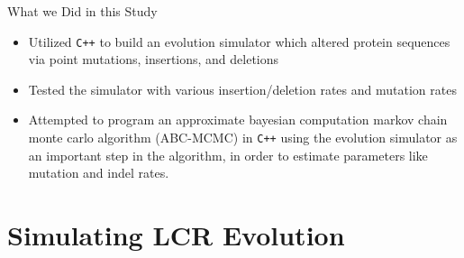\documentclass{beamer}
\begin{document}
	\begin{frame}{What we Did in this Study}
		\begin{itemize}
			\item Utilized \texttt{C++} to build an evolution simulator which altered protein sequences via point mutations, insertions, and deletions \newline
			\item Tested the simulator with various insertion/deletion rates and mutation rates \newline
			\item Attempted to program an approximate bayesian computation markov chain monte carlo algorithm (ABC-MCMC) in \texttt{C++} using the evolution simulator as an important step in the algorithm, in order to estimate parameters like mutation and indel rates.
		\end{itemize}
	\end{frame}

	\section{Simulating LCR Evolution}
	
\end{document}
